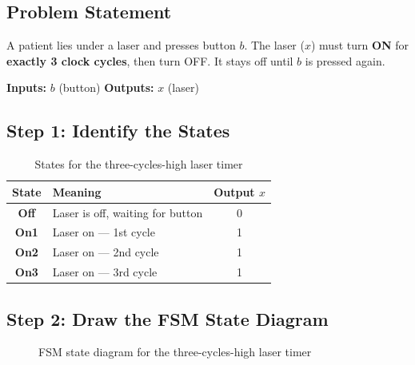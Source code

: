 \documentclass[12pt, a4paper]{article}
\begin{document}
\subsection{Problem Statement}

\begin{keypoint}
  A patient lies under a laser and presses button $b$. The laser ($x$) must turn \textbf{ON} for \textbf{exactly 3 clock cycles}, then turn OFF. It stays off until $b$ is pressed again.
  
  \textbf{Inputs:} $b$ (button) \quad \textbf{Outputs:} $x$ (laser)
\end{keypoint}

\subsection{Step 1: Identify the States}

\begin{table}[H]
\centering
\renewcommand{\arraystretch}{1.3}
\begin{tabular}{@{} >{\bfseries}c l c @{}}
  \toprule
  State & Meaning & Output $x$ \\
  \midrule
  Off & Laser is off, waiting for button & 0 \\
  On1 & Laser on --- 1st cycle & 1 \\
  On2 & Laser on --- 2nd cycle & 1 \\
  On3 & Laser on --- 3rd cycle & 1 \\
  \bottomrule
\end{tabular}
\caption{States for the three-cycles-high laser timer}
\end{table}

\subsection{Step 2: Draw the FSM State Diagram}

\begin{figure}[H]
\centering
{}
\caption{FSM state diagram for the three-cycles-high laser timer}
\label{fig:laser-fsm}
\end{figure}
\end{document}
